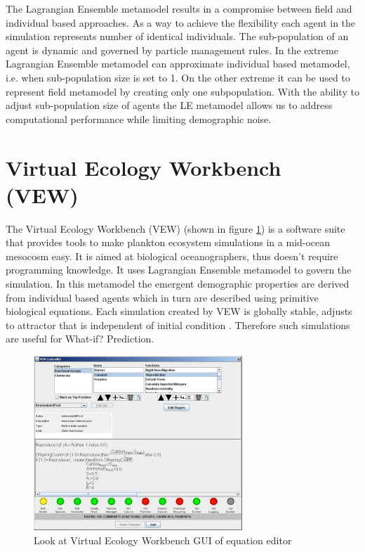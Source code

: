 \documentclass[12pt, a4paper]{report}
\begin{document}
The Lagrangian Ensemble metamodel results in a compromise between field
and individual based approaches. As a way to achieve the flexibility
each agent in the simulation represents number of identical individuals.
The sub-population of an agent is dynamic and governed by particle
management rules. In the extreme Lagrangian Ensemble metamodel can
approximate individual based metamodel, i.e. when sub-population size is
set to 1. On the other extreme it can be used to represent field metamodel
by creating only one subpopulation. With the ability to adjust
sub-population size of agents the LE metamodel allows us to address
computational performance while limiting demographic noise.

\section{Virtual Ecology Workbench (VEW)}\label{sec:vew}
The Virtual Ecology Workbench (VEW) (shown in figure \ref{fig:VEW})
is a software suite that provides tools to make plankton ecosystem
simulations in a mid-ocean mesocosm easy. It is aimed at biological
oceanographers, thus doesn't require programming knowledge. It uses
Lagrangian Ensemble metamodel to govern the simulation. In this
metamodel the emergent demographic properties are derived from
individual based agents which in turn are described
using primitive biological equations. Each simulation created
by VEW is globally stable, adjusts to attractor that is independent
of initial condition \cite{Woods2005}. Therefore such simulations
are useful for What-if? Prediction.

\begin{figure}[H]
  \begin{center}
    \includegraphics[width=0.7\textwidth,natwidth=808,natheight=676]{images/vew2007-10.jpg}
    \caption{Look at Virtual Ecology Workbench GUI of equation editor}
    \label{fig:VEW}
  \end{center}
\end{figure}
\end{document}
